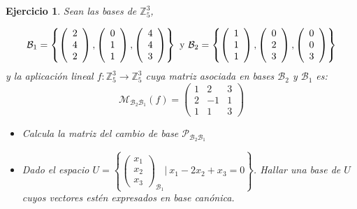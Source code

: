 \documentclass{amsart}
\newtheorem{ejer}{Ejercicio}
\def\z{\mathbb{Z}}
\begin{document}
\begin{ejer} Sean las bases de $\z ^3_5$, 

\[\mathcal{B}_1 = \left\lbrace \left( \begin{array}{r}
2 \\ 4 \\ 2            
\end{array} \right), 
\left( \begin{array}{c}
           
0 \\ 1 \\ 1           
\end{array} \right), 
\left( \begin{array}{c}
           
4 \\ 4 \\ 3           
\end{array} \right) \right\rbrace \hbox{ y } 
\mathcal{B}_2 = \left\lbrace \left( \begin{array}{r}
1 \\ 1 \\ 1            
\end{array} \right), 
\left( \begin{array}{c}
           
0 \\ 2 \\ 3           
\end{array} \right), 
\left( \begin{array}{c}
           
0 \\ 0 \\ 3           
\end{array} \right) \right\rbrace \] y la aplicaci\'on lineal $f: \z ^3_5 \longrightarrow \z ^3_5$ cuya matriz asociada en bases $\mathcal{B}_2$ y $\mathcal{B}_1$ es:
\[ \mathcal{M}_{\mathcal{B}_2 \mathcal{B}_1}(f) = \left( \begin{array}{crc}
1 & 2 & 3  \\ 
2 & -1 & 1 \\
1 & 1 & 3           
\end{array} \right) \]
\begin{itemize}
\item[a)] Calcula la matriz del cambio de base $\mathcal{P}_{\mathcal{B}_2 \mathcal{B}_1}$

\item[b)] Dado el espacio $U = \left\lbrace  \left( \begin{array}{r}
x_1 \\ x_2 \\ x_3            
\end{array} \right)_{\mathcal{B}_1} | \  x_1-2x_2+x_3 = 0   \right\rbrace $. Hallar una base de $U$ cuyos vectores est\'en expresados en base can\'onica. 


\end{itemize}
\end{ejer}
\end{document}
